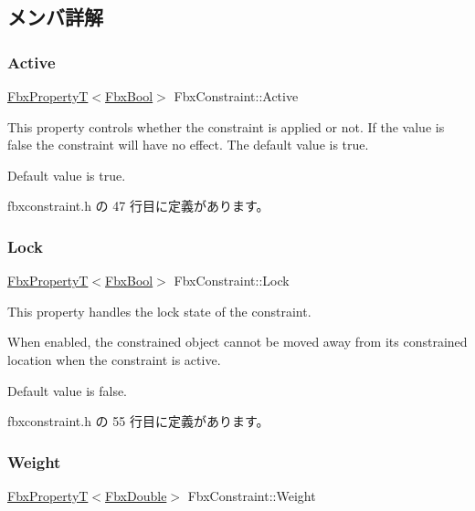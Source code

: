 \subsection{メンバ詳解}
\mbox{\label{class_fbx_constraint_ab34f884cb053f5bb9c18f65582ab84e1}} 
\subsubsection{\texorpdfstring{Active}{Active}}
{\footnotesize\ttfamily \hyperlink{class_fbx_property_t}{Fbx\+PropertyT}$<$\hyperlink{fbxtypes_8h_a92e0562b2fe33e76a242f498b362262e}{Fbx\+Bool}$>$ Fbx\+Constraint\+::\+Active}

This property controls whether the constraint is applied or not. If the value is {\ttfamily false} the constraint will have no effect. The default value is {\ttfamily true}.

Default value is true. 

 fbxconstraint.\+h の 47 行目に定義があります。

\mbox{\label{class_fbx_constraint_a591ebe51dd090af37644355200b70d9a}} 
\subsubsection{\texorpdfstring{Lock}{Lock}}
{\footnotesize\ttfamily \hyperlink{class_fbx_property_t}{Fbx\+PropertyT}$<$\hyperlink{fbxtypes_8h_a92e0562b2fe33e76a242f498b362262e}{Fbx\+Bool}$>$ Fbx\+Constraint\+::\+Lock}

This property handles the lock state of the constraint.

When enabled, the constrained object cannot be moved away from its constrained location when the constraint is active.

Default value is false. 

 fbxconstraint.\+h の 55 行目に定義があります。

\mbox{\label{class_fbx_constraint_ad056a05f11bcd1df8aae65fa6ab941d6}} 
\subsubsection{\texorpdfstring{Weight}{Weight}}
{\footnotesize\ttfamily \hyperlink{class_fbx_property_t}{Fbx\+PropertyT}$<$\hyperlink{fbxtypes_8h_a171e72a1c46fc15c1a6c9c31948c1c5b}{Fbx\+Double}$>$ Fbx\+Constraint\+::\+Weight}

